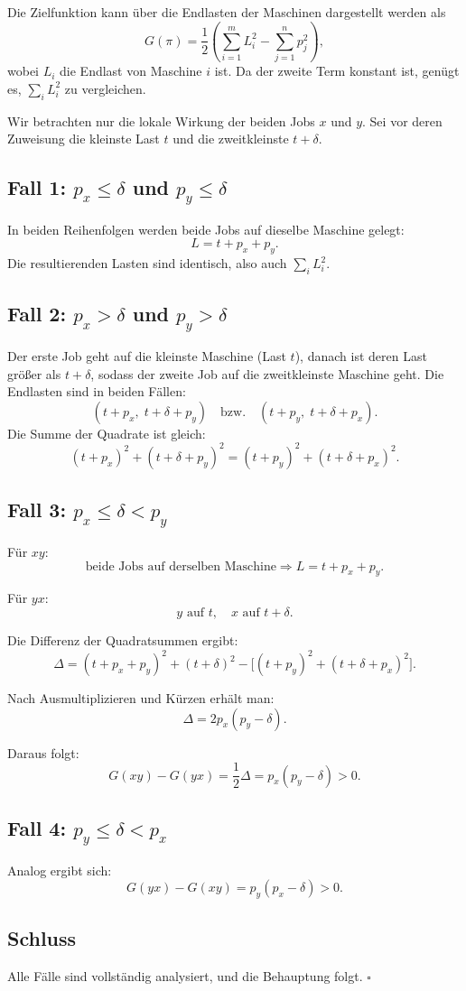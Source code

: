 \documentclass[a4paper,11pt]{article}
\begin{document}
Die Zielfunktion kann über die Endlasten der Maschinen dargestellt werden als
\[
G(\pi) = \frac{1}{2} \left( \sum_{i=1}^m L_i^2 - \sum_{j=1}^n p_j^2 \right),
\]
wobei $L_i$ die Endlast von Maschine $i$ ist. Da der zweite Term konstant ist,
genügt es, $\sum_i L_i^2$ zu vergleichen.

Wir betrachten nur die lokale Wirkung der beiden Jobs $x$ und $y$. Sei vor deren
Zuweisung die kleinste Last $t$ und die zweitkleinste $t+\delta$.

\subsection*{Fall 1: $p_x \le \delta$ und $p_y \le \delta$}

In beiden Reihenfolgen werden beide Jobs auf dieselbe Maschine gelegt:
\[
L = t + p_x + p_y.
\]
Die resultierenden Lasten sind identisch, also auch $\sum_i L_i^2$.

\subsection*{Fall 2: $p_x > \delta$ und $p_y > \delta$}

Der erste Job geht auf die kleinste Maschine (Last $t$), danach ist deren Last
größer als $t+\delta$, sodass der zweite Job auf die zweitkleinste Maschine geht.
Die Endlasten sind in beiden Fällen:
\[
(t + p_x, \; t+\delta + p_y)
\quad \text{bzw.} \quad
(t + p_y, \; t+\delta + p_x).
\]
Die Summe der Quadrate ist gleich:
\[
{(t+p_x)}^2 + {(t+\delta+p_y)}^2 = {(t+p_y)}^2 + {(t+\delta+p_x)}^2.
\]

\subsection*{Fall 3: $p_x \le \delta < p_y$}

Für $xy$:
\[
\text{beide Jobs auf derselben Maschine} \Rightarrow L = t + p_x + p_y.
\]

Für $yx$:
\[
y \text{ auf } t, \quad x \text{ auf } t+\delta.
\]

Die Differenz der Quadratsummen ergibt:
\[
\Delta = {(t+p_x+p_y)}^2 + {(t+\delta)}^2 - \big[{(t+p_y)}^2 + {(t+\delta+p_x)}^2\big].
\]

Nach Ausmultiplizieren und Kürzen erhält man:
\[
\Delta = 2 p_x (p_y - \delta).
\]

Daraus folgt:
\[
G(xy) - G(yx) = \frac{1}{2} \Delta = p_x (p_y - \delta) > 0.
\]

\subsection*{Fall 4: $p_y \le \delta < p_x$}

Analog ergibt sich:
\[
G(yx) - G(xy) = p_y (p_x - \delta) > 0.
\]

\subsection*{Schluss}

Alle Fälle sind vollständig analysiert, und die Behauptung folgt.
\hfill $\square$
\end{document}
